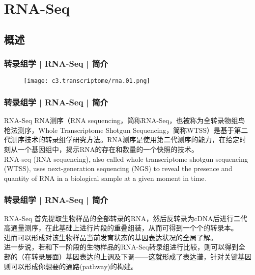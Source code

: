 \section{RNA-Seq}
\subsection{概述}
\begin{frame}
  \frametitle{转录组学 | RNA-Seq | 简介}
  \begin{figure}
    \centering
    \texttt{[image: c3.transcriptome/rna.01.png]}
  \end{figure}
\end{frame}

\begin{frame}
  \frametitle{转录组学 | RNA-Seq | 简介}
  \begin{block}{RNA-Seq}
 RNA测序（RNA sequencing，简称RNA-Seq，也被称为全转录物组鸟枪法测序，Whole Transcriptome Shotgun Sequencing，简称WTSS）是基于第二代测序技术的转录组学研究方法。RNA测序是使用第二代测序的能力，在给定时刻从一个基因组中，揭示RNA的存在和数量的一个快照的技术。\\
 \vspace{1em}
RNA-seq (RNA sequencing), also called whole transcriptome shotgun sequencing (WTSS), uses next-generation sequencing (NGS) to reveal the presence and quantity of RNA in a biological sample at a given moment in time.
  \end{block}
\end{frame}

\begin{frame}
  \frametitle{转录组学 | RNA-Seq | 简介}
  \begin{block}{RNA-Seq}
首先提取生物样品的全部转录的RNA，然后反转录为cDNA后进行二代高通量测序，在此基础上进行片段的重叠组装，从而可得到一个个的转录本。\\
\vspace{0.5em}
进而可以形成对该生物样品当前发育状态的基因表达状况的全局了解。\\
\vspace{0.5em}
进一步说，若和下一阶段的生物样品的RNA-Seq转录组进行比较，则可以得到全部的（在转录层面）基因表达的上调及下调——这就形成了表达谱，针对关键基因则可以形成你想要的通路(pathway)的构建。
  \end{block}
\end{frame}


